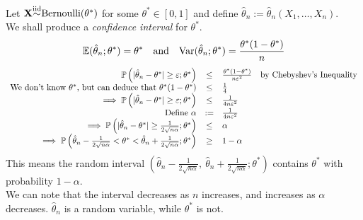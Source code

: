 \documentclass[11pt,a4paper]{article}
\begin{document}
Let $\textbf{X}{\overset{\text{iid}}{\sim}}\text{Bernoulli}(\theta^*)$ for some $\theta^*\in[0,1]$ and define $\hat{\theta}_n:=\hat{\theta}_n(X_1,\dots,X_n)$.\\
We shall produce a \textit{confidence interval} for $\theta^*$.\\
	$$\mathbb{E}(\hat{\theta}_n;\theta^*)=\theta^*\quad\text{and}\quad\mathrm{Var}(\hat{\theta}_n;\theta^*)=\frac{\theta^*(1-\theta^*)}{n}$$
\[\begin{array}{rcll}
\mathbb{P}\left(|\hat{\theta}_n-\theta^*|\geq\varepsilon;\theta^*\right)&\leq&\frac{\theta^*(1-\theta^*)}{n\varepsilon^2}&\text{by Chebyshev's Inequality}\\
\text{We don't know $\theta^*$, but can deduce that }\theta^*(1-\theta^*)&\leq&\frac{1}{4}\\
\implies\mathbb{P}\left(|\hat{\theta}_n-\theta^*|\geq\varepsilon;\theta^*\right)&\leq&\frac{1}{4n\varepsilon^2}\\
\text{Define }\alpha&:=&\frac{1}{4n\varepsilon^2}\\
\implies\mathbb{P}\left(|\hat{\theta}_n-\theta^*|\geq\frac{1}{2\sqrt{n\alpha}};\theta^*\right)&\leq&\alpha\\
\implies\mathbb{P}\left(\hat{\theta}_n-\frac{1}{2\sqrt{n\alpha}}<\theta^*<\hat{\theta}_n+\frac{1}{2\sqrt{n\alpha}};\theta^*\right)&\geq&1-\alpha
\end{array}\]
This means the random interval $(\hat{\theta}_n-\frac{1}{2\sqrt{n\alpha}},\ \hat{\theta}_n+\frac{1}{2\sqrt{n\alpha}};\theta^*)$ contains $\theta^*$ with probability $1-\alpha$.\\
We can note that the interval decreases as $n$ increases, and increases as $\alpha$ decreases.
\nb $\hat{\theta}_n$ is a random variable, while $\theta^*$ is not.\\
\end{document}
